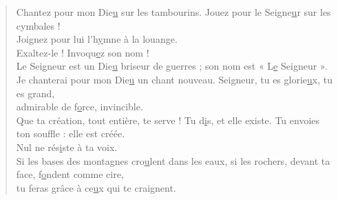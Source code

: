 \begin{verse}
Chantez pour mon Die\underline{u} sur les tambourins.\psalmstar
Jouez pour le Seigne\underline{u}r sur les cymbales !\\
Joignez pour lui l'h\underline{y}mne à la louange.\\

Exaltez-le ! Invoqu\underline{e}z son nom !\\
Le Seigneur est un Die\underline{u} briseur de guerres ;\psalmstar
son nom est « L\underline{e} Seigneur ».\\

Je chanterai pour mon Die\underline{u} un chant nouveau.\psalmstar
Seigneur, tu es glorie\underline{u}x, tu es grand,\\
admirable de f\underline{o}rce, invincible.\\

Que ta création, tout entière, te serve !\psalmstar
Tu d\underline{i}s, et elle existe. \psalmstar
Tu envoies ton souffle : elle est créée.\\
Nul ne rés\underline{i}ste à ta voix.\\

Si les bases des montagnes cro\underline{u}lent dans les eaux,\psalmstar
si les rochers, devant ta face, f\underline{o}ndent comme cire,\\
tu feras grâce à ce\underline{u}x qui te craignent.
\end{verse}

